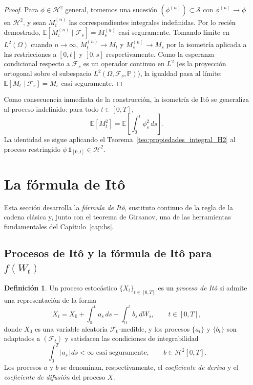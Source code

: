\documentclass[11pt,a4paper,oneside]{report}
\theoremstyle{plain}
\theoremstyle{definition}
\newtheorem{definicion}[teorema]{Definición}
\theoremstyle{remark}
\newcommand{\E}{\mathbb{E}}
\newcommand{\PP}{\mathbb{P}}
\newcommand{\F}{\mathcal{F}}
\newcommand{\1}{\mathbf{1}}
\begin{document}
\begin{proof}
Para $\phi \in \mathcal{H}^2$ general, tomemos una sucesión
$(\phi^{(n)}) \subset \mathcal{S}$ con $\phi^{(n)} \to \phi$ en
$\mathcal{H}^2$, y sean $M_t^{(n)}$ las correspondientes integrales
indefinidas. Por lo recién demostrado, $\E[M_t^{(n)} \mid \F_s] =
M_s^{(n)}$ casi seguramente. Tomando límite en $L^2(\Omega)$ cuando $n
\to \infty$, $M_t^{(n)} \to M_t$ y $M_s^{(n)} \to M_s$ por la
isometría aplicada a las restricciones a $[0, t]$ y $[0, s]$
respectivamente. Como la esperanza condicional respecto a $\F_s$ es un
operador continuo en $L^2$ (es la proyección ortogonal sobre el
subespacio $L^2(\Omega, \F_s, \PP)$), la igualdad pasa al límite:
$\E[M_t \mid \F_s] = M_s$ casi seguramente.
\end{proof}

Como consecuencia
inmediata de la construcción, la isometría de Itô se generaliza al
proceso indefinido: para todo $t \in [0, T]$,
\begin{equation}\label{eq:isometria_proceso}
  \E[M_t^2] = \E\!\left[\int_0^t \phi_s^2\, ds\right].
\end{equation}
La identidad se sigue aplicando el
Teorema~\ref{teo:propiedades_integral_H2} al proceso restringido
$\phi\, \mathbf{1}_{[0, t]} \in \mathcal{H}^2$. 

\section{La fórmula de Itô}
\label{sec:formula_ito}

Esta sección desarrolla la \emph{fórmula de Itô}, sustituto continuo
de la regla de la cadena clásica y, junto con el teorema de Girsanov,
una de las herramientas fundamentales del Capítulo~\ref{cap:bs}.

\subsection{Procesos de Itô y la fórmula de Itô para $f(W_t)$}
\label{subsec:procesos_ito_y_formula}

\begin{definicion}
\label{def:proceso_ito}
Un proceso estocástico $\{X_t\}_{t \in [0, T]}$ es un \emph{proceso de
Itô} si admite una representación de la forma
\begin{equation}\label{eq:def_proceso_ito}
  X_t = X_0 + \int_0^t a_s\, ds + \int_0^t b_s\, dW_s,
  \qquad t \in [0, T],
\end{equation}
donde $X_0$ es una variable aleatoria $\F_0$-medible, y los procesos
$\{a_t\}$ y $\{b_t\}$ son adaptados a $(\F_t)$ y satisfacen las
condiciones de integrabilidad
\begin{equation*}
  \int_0^T |a_s|\, ds < \infty \text{ casi seguramente},
  \qquad b \in \mathcal{H}^2[0, T].
\end{equation*}
Los procesos $a$ y $b$ se denominan, respectivamente, el
\emph{coeficiente de deriva} y el \emph{coeficiente de difusión} del
proceso $X$.
\end{definicion}
\end{document}
